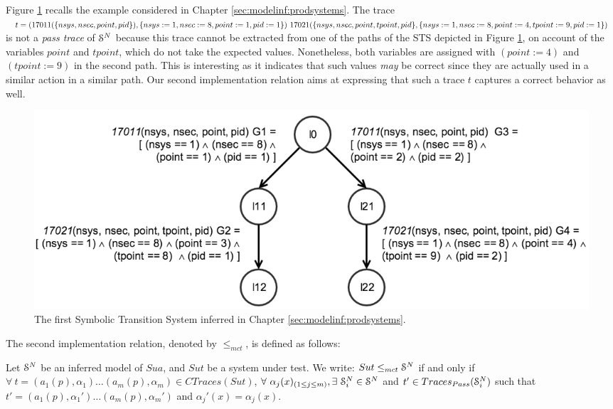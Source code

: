 \begin{example}
    Figure \ref{fig:sts-ch4} recalls the example considered in
    Chapter \ref{sec:modelinf:prodsystems}. The trace $t =
    (17011(\{ nsys, nsec, point, pid \}), \{
    nsys:=1, nsec:=8, point:=1, pid:=1 \})\text{ }
    17021(\{ nsys, nsec, point, tpoint, pid \}, \{
    nsys:=1, nsec:=8, point:=4, tpoint\\:=9, pid:=1 \})$ is not
    a \emph{pass trace} of $\EuScript{S}^{N}$ because this trace
    cannot be extracted from one of the paths of the STS depicted
    in Figure \ref{fig:sts-ch4}, on account of the variables
    $point$ and $tpoint$, which do not take the expected values.
    Nonetheless, both variables are assigned with $(point := 4)$
    and $(tpoint := 9)$ in the second path. This is interesting
    as it indicates that such values \emph{may} be correct since
    they are actually used in a similar action in a similar path.
    Our second implementation relation aims at expressing that
    such a trace $t$ captures a correct behavior as well.

    \begin{figure}[ht]
        \begin{center}
            \includegraphics[width=1.0\linewidth]{figures/STS1.png}
        \end{center}

        \caption{The first Symbolic Transition System inferred in
        Chapter \ref{sec:modelinf:prodsystems}.}
        \label{fig:sts-ch4}
    \end{figure}
\end{example}

The second implementation relation, denoted by $\leq_{mct}$, is
defined as follows:

\begin{definition}
     Let $\EuScript{S}^{N}$ be an inferred model of
     $\mathit{Sua}$, and $\mathit{Sut}$ be a system under test.
     We write: ${Sut} \leq_{mct} \EuScript{S}^{N}$ if and only if
     $\forall ~t= (a_1(p), \alpha_1) \dots (a_m(p), \alpha_m) \in
     CTraces({Sut})$, $\forall ~\alpha_j(x)_{(1 \leq j \leq m)},
     \exists ~\EuScript{S}_i^{N} \in \EuScript{S}^{N}$ and $t'
     \in Traces_{Pass}(\EuScript{S}_i^{N})$ such that
     $t'=(a_1(p), \alpha_1') \dots (a_m(p), \alpha_m')$ and
     $\alpha_j'(x)=\alpha_j(x)$.

     \label{impl21}
\end{definition}

